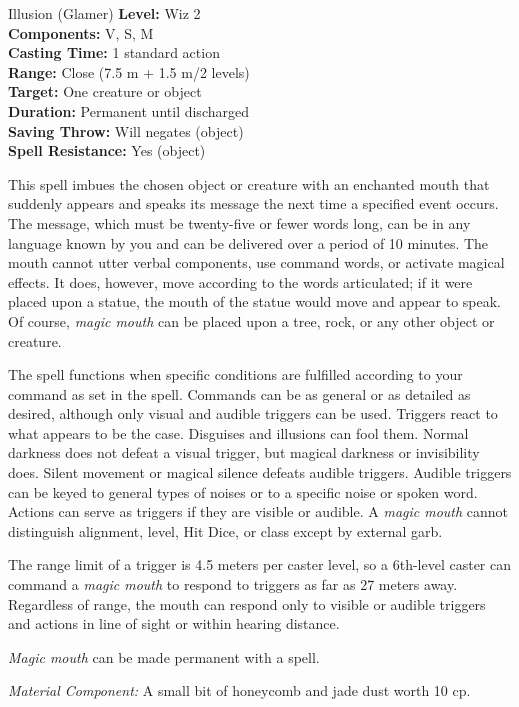 {Illusion (Glamer)}
{
	\textbf{Level:}
	Wiz 2\\
	\textbf{Components:}
	V, S, M\\
	\textbf{Casting Time:}
	1 standard action\\
	\textbf{Range:}
	Close (7.5 m + 1.5 m/2 levels)\\
	\textbf{Target:}
	One creature or object\\
	\textbf{Duration:}
	Permanent until discharged\\
	\textbf{Saving Throw:}
	Will negates (object)\\
	\textbf{Spell Resistance:}
	Yes (object)\\
}
{
	This spell imbues the chosen object or creature with an enchanted mouth that suddenly appears and speaks its message the next time a specified event occurs. The message, which must be twenty-five or fewer words long, can be in any language known by you and can be delivered over a period of 10 minutes. The mouth cannot utter verbal components, use command words, or activate magical effects. It does, however, move according to the words articulated; if it were placed upon a statue, the mouth of the statue would move and appear to speak. Of course, \emph{magic mouth} can be placed upon a tree, rock, or any other object or creature.

	The spell functions when specific conditions are fulfilled according to your command as set in the spell. Commands can be as general or as detailed as desired, although only visual and audible triggers can be used. Triggers react to what appears to be the case. Disguises and illusions can fool them. Normal darkness does not defeat a visual trigger, but magical darkness or invisibility does. Silent movement or magical silence defeats audible triggers. Audible triggers can be keyed to general types of noises or to a specific noise or spoken word. Actions can serve as triggers if they are visible or audible. A \emph{magic mouth} cannot distinguish alignment, level, Hit Dice, or class except by external garb.

	The range limit of a trigger is 4.5 meters per caster level, so a 6th-level caster can command a \emph{magic mouth} to respond to triggers as far as 27 meters away. Regardless of range, the mouth can respond only to visible or audible triggers and actions in line of sight or within hearing distance.

	\emph{Magic mouth} can be made permanent with a  spell.

	\textit{Material Component:}
	A small bit of honeycomb and jade dust worth 10 cp.

}
